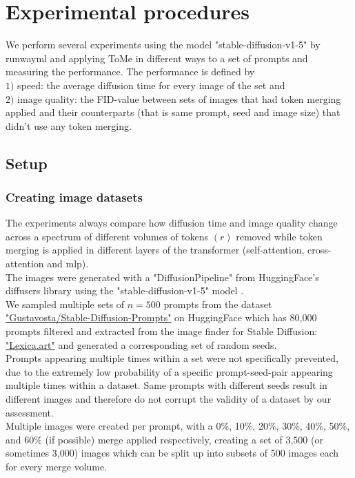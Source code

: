 \section{Experimental procedures}
We perform several experiments using the model "stable-diffusion-v1-5" by runwayml \cite{Rombach_2022_CVPR} and applying ToMe in different ways to a set of prompts and measuring the performance.
The performance is defined by\\ 
\(1)\) speed: the average diffusion time for every image of the set and\\
\(2)\) image quality: the FID-value between sets of images that had token merging applied and their counterparts (that is same prompt, seed and image size) that didn't use any token merging.



\subsection{Setup}
\subsubsection*{Creating image datasets}
The experiments always compare how diffusion time and image quality change across a spectrum of different volumes of tokens \((r)\) removed while token merging is applied in different layers of the transformer (self-attention, cross-attention and mlp).\\
The images were generated with a "DiffusionPipeline" from HuggingFace's diffusers library \cite{von-platen-etal-2022-diffusers} using the "stable-diffusion-v1-5" model \cite{Rombach_2022_CVPR}.\\
We sampled multiple sets of \(n=500\) prompts from the dataset \href{https://huggingface.co/datasets/Gustavosta/Stable-Diffusion-Prompts}{"Gustavosta/Stable-Diffusion-Prompts"} on HuggingFace which has 80,000 prompts filtered and extracted from the image finder for Stable Diffusion: \href{https://lexica.art}{"Lexica.art"} and generated a corresponding set of random seeds.\\ 
Prompts appearing multiple times within a set were not specifically prevented, due to the extremely low probability of a specific prompt-seed-pair appearing multiple times within a dataset. Same prompts with different seeds result in different images and therefore do not corrupt the validity of a dataset by our assessment.\\
Multiple images were created per prompt, with a 0\%, 10\%, 20\%, 30\%, 40\%, 50\%, and 60\% (if possible) merge applied respectively, creating a set of 3,500 (or sometimes 3,000) images which can be split up into subsets of 500 images each for every merge volume.



